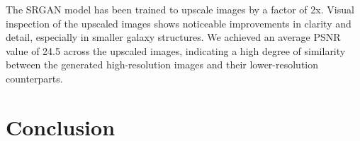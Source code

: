 \documentclass[10pt,twocolumn,letterpaper]{article}
\begin{document}
The SRGAN model has been trained to upscale images by a factor of 2x. 
Visual inspection of the upscaled images shows noticeable improvements in clarity and detail, especially in smaller galaxy structures. 
We achieved an average PSNR value of 24.5 across the upscaled images, indicating a high degree of similarity between the generated high-resolution images and their lower-resolution counterparts.




\section{Conclusion}

{
    \small
    \nocite{*}
    
    
}
\end{document}
